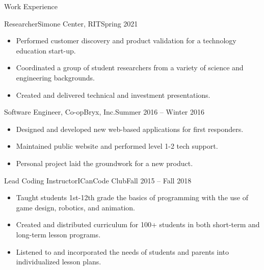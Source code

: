 \documentclass[]{mcdowellcv}
\begin{document}
	\makeheader
	
	\begin{cvsection}{Work Experience}
		\begin{cvsubsection}{Researcher}{Simone Center, RIT}{Spring 2021}
				
			\begin{itemize}
				\item Performed customer discovery and product validation for a technology education start-up.
				\item Coordinated a group of student researchers from a variety of science and engineering backgrounds.
				\item Created and delivered technical and investment presentations.
			\end{itemize}
		\end{cvsubsection}
		
		\begin{cvsubsection}{Software Engineer, Co-op}{Bryx, Inc.}{Summer 2016 -- Winter 2016}	
			\begin{itemize}
				\item Designed and developed new web-based applications for first responders.
				\item Maintained public website and performed level 1-2 tech support.
				\item Personal project laid the groundwork for a new product.
			\end{itemize}
		\end{cvsubsection}
		
		\begin{cvsubsection}{Lead Coding Instructor}{ICanCode Club}{Fall 2015 -- Fall 2018}		
			\begin{itemize}
				\item Taught students 1st-12th grade the basics of programming with the use of game design, robotics, and animation.
				\item Created and distributed curriculum for 100+ students in both short-term and long-term lesson programs.
				\item Listened to and incorporated the needs of students and parents into individualized lesson plans.
			\end{itemize}
		\end{cvsubsection}	
	\end{cvsection}
	
\end{document}
